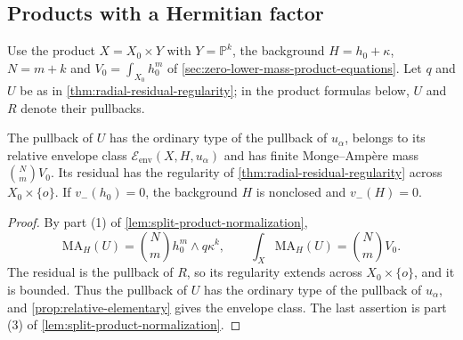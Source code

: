 \subsection{Products with a Hermitian factor}
Use the product $X=X_0\times Y$ with $Y=\mathbb P^k$, the background $H=h_0+\kappa$, $N=m+k$ and $V_0=\int_{X_0}h_0^m$ of \cref{sec:zero-lower-mass-product-equations}. Let $q$ and $U$ be as in \cref{thm:radial-residual-regularity}; in the product formulas below, $U$ and $R$ denote their pullbacks.
\begin{corollary}\label{cor:radial-residual-nonclosed-product}
The pullback of $U$ has the ordinary type of the pullback of $u_\alpha$, belongs to its relative envelope class $\mathcal E_{\mathrm{env}}(X,H,u_\alpha)$ and has finite Monge--Amp\`ere mass $\binom Nm V_0$. Its residual has the regularity of \cref{thm:radial-residual-regularity} across $X_0\times\{o\}$. If $v_-(h_0)=0$, the background $H$ is nonclosed and $v_-(H)=0$.
\end{corollary}
\begin{proof}
By part (1) of \cref{lem:split-product-normalization},
\[
 \mathrm{MA}_H(U)=\binom Nm h_0^m\wedge q\kappa^k,
 \qquad \int_X\mathrm{MA}_H(U)=\binom Nm V_0.
\]
The residual is the pullback of $R$, so its regularity
extends across $X_0\times\{o\}$, and it is bounded. Thus the pullback of $U$ has the ordinary type of the
pullback of $u_\alpha$, and \cref{prop:relative-elementary} gives the envelope class. The last assertion is part (3) of \cref{lem:split-product-normalization}.
\end{proof}

